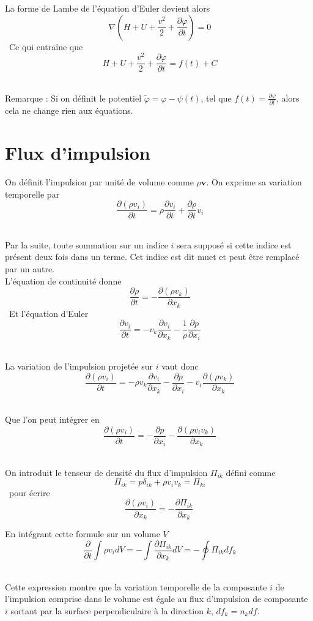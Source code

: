 \documentclass[10pt,a4paper]{book}
\begin{document}
La forme de Lambe de l'équation d'Euler devient alors \[\ \nabla (H+U+\frac{v^2}{2}+\frac{\partial \varphi}{\partial t})=0 \]\
Ce qui entraîne que \[\ H+U+\frac{v^2}{2}+\frac{\partial \varphi}{\partial t}=f(t)+C \]\

Remarque : Si on définit le potentiel $\tilde{\varphi}=\varphi-\psi(t)$, tel que $f(t)=\frac{\partial \psi}{\partial t}$, alors cela ne change rien aux équations.

\section{Flux d'impulsion}

On définit l'impulsion par unité de volume comme $\rho\mathbf{v}$. On exprime sa variation temporelle par \[\ \frac{\partial (\rho v_i)}{\partial t}=\rho\frac{\partial v_i}{\partial t}+\frac{\partial \rho}{\partial t}v_i\]\

Par la suite, toute sommation sur un indice $i$ sera supposé si cette indice est présent deux fois dans un terme. Cet indice est dit muet et peut être remplacé par un autre.\\

L'équation de continuité donne \[\ \frac{\partial \rho}{\partial t} = - \frac{\partial (\rho v_k)}{\partial x_k} \]\
Et l'équation d'Euler\[\ \frac{\partial v_i}{\partial t}=-v_k\frac{\partial v_i}{\partial x_k}-\frac{1}{\rho}\frac{\partial p}{\partial x_i} \]\

La variation de l'impulsion projetée sur $i$ vaut donc \[\ \frac{\partial (\rho v_i)}{\partial t}=-\rho v_k\frac{\partial v_i}{\partial x_k}-\frac{\partial p}{\partial x_i}-v_i\frac{\partial (\rho v_k)}{\partial x_k} \]\

Que l'on peut intégrer en \[\ \frac{\partial (\rho v_i)}{\partial t}=-\frac{\partial p}{\partial x_i}-\frac{\partial(\rho v_i v_k)}{\partial x_k}\]\

On introduit le tenseur de densité du flux d'impulsion $\Pi_{ik}$ défini comme \[\ \Pi_{ik}=p\delta_{ik}+\rho v_i v_k = \Pi_{ki}\]\ 
pour écrire 
\begin{equation}
\frac{\partial (\rho v_i)}{\partial x_k}=-\frac{\partial \Pi_{ik}}{\partial x_k}
\end{equation}

En intégrant cette formule sur un volume $V$ \[\ \frac{\partial }{\partial t}\int \rho v_i dV=-\int \frac{\partial \Pi_{ik}}{\partial x_k}dV=-\oint \Pi_{ik}df_k \]\

Cette expression montre que la variation temporelle de la composante $i$ de l'impulsion comprise dans le volume est égale au flux d'impulsion de composante $i$ sortant par la surface perpendiculaire à la direction $k$, $df_k=n_kdf$.\\
\end{document}
